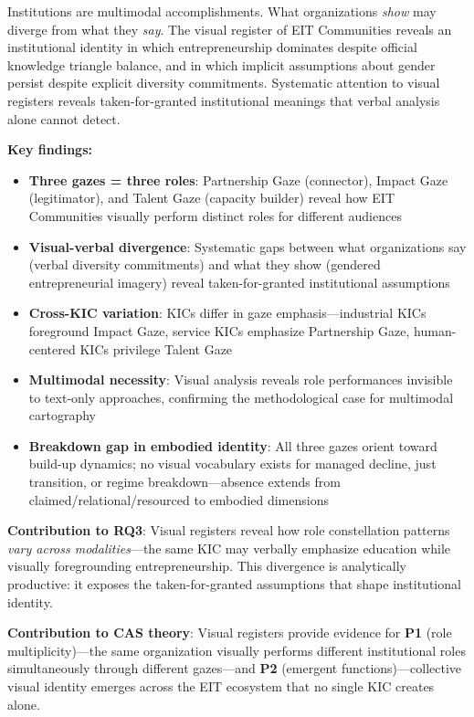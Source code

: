\documentclass[../main.tex]{subfiles}
\begin{document}
Institutions are multimodal accomplishments. What organizations \textit{show} may diverge from what they \textit{say}. The visual register of EIT Communities reveals an institutional identity in which entrepreneurship dominates despite official knowledge triangle balance, and in which implicit assumptions about gender persist despite explicit diversity commitments. Systematic attention to visual registers reveals taken-for-granted institutional meanings that verbal analysis alone cannot detect.

\begin{summarybox}
\textbf{Key findings:}
\begin{itemize}[leftmargin=*, itemsep=0.1em]
\item \textbf{Three gazes = three roles}: Partnership Gaze (connector), Impact Gaze (legitimator), and Talent Gaze (capacity builder) reveal how EIT Communities visually perform distinct roles for different audiences
\item \textbf{Visual-verbal divergence}: Systematic gaps between what organizations say (verbal diversity commitments) and what they show (gendered entrepreneurial imagery) reveal taken-for-granted institutional assumptions
\item \textbf{Cross-KIC variation}: KICs differ in gaze emphasis---industrial KICs foreground Impact Gaze, service KICs emphasize Partnership Gaze, human-centered KICs privilege Talent Gaze
\item \textbf{Multimodal necessity}: Visual analysis reveals role performances invisible to text-only approaches, confirming the methodological case for multimodal cartography
\item \textbf{Breakdown gap in embodied identity}: All three gazes orient toward build-up dynamics; no visual vocabulary exists for managed decline, just transition, or regime breakdown---absence extends from claimed/relational/resourced to embodied dimensions
\end{itemize}

\textbf{Contribution to RQ3}: Visual registers reveal how role constellation patterns \emph{vary across modalities}---the same KIC may verbally emphasize education while visually foregrounding entrepreneurship. This divergence is analytically productive: it exposes the taken-for-granted assumptions that shape institutional identity.

\textbf{Contribution to CAS theory}: Visual registers provide evidence for \textbf{P1} (role multiplicity)---the same organization visually performs different institutional roles simultaneously through different gazes---and \textbf{P2} (emergent functions)---collective visual identity emerges across the EIT ecosystem that no single KIC creates alone.
\end{summarybox}
\end{document}
